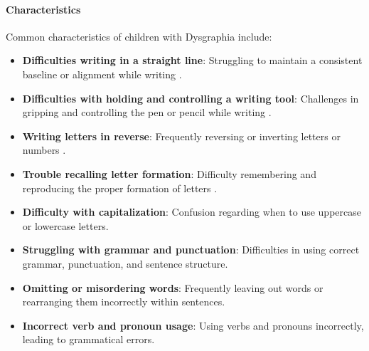 \paragraph{Characteristics}
Common characteristics of children with Dysgraphia include:
\begin{itemize}
    \item \textbf{Difficulties writing in a straight line}: Struggling to maintain a consistent baseline or alignment while writing \cite{cleveland_dysgraphia}.
    \item \textbf{Difficulties with holding and controlling a writing tool}: Challenges in gripping and controlling the pen or pencil while writing \cite{understood_accommodations}.
    \item \textbf{Writing letters in reverse}: Frequently reversing or inverting letters or numbers \cite{pmc_dysgraphia}.
    \item \textbf{Trouble recalling letter formation}: Difficulty remembering and reproducing the proper formation of letters \cite{edutopia_dysgraphia}.
    \item \textbf{Difficulty with capitalization}: Confusion regarding when to use uppercase or lowercase letters.
    \item \textbf{Struggling with grammar and punctuation}: Difficulties in using correct grammar, punctuation, and sentence structure.
    \item \textbf{Omitting or misordering words}: Frequently leaving out words or rearranging them incorrectly within sentences.
    \item \textbf{Incorrect verb and pronoun usage}: Using verbs and pronouns incorrectly, leading to grammatical errors.
\end{itemize}

